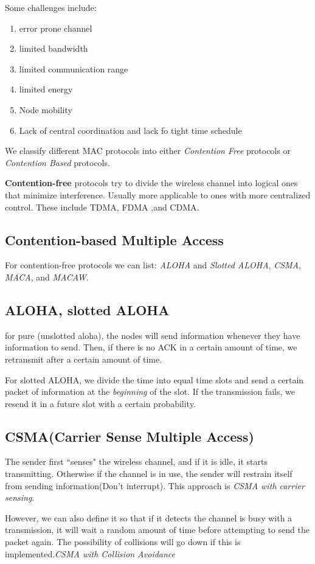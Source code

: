 \documentclass{article}
\begin{document}
Some challenges include:
\begin{enumerate}
		\item{error prone channel}
		\item{limited bandwidth}
		\item{limited communication range}
		\item{limited energy}
		\item{Node mobility}
		\item{Lack of central coordination and lack fo tight time schedule}
\end{enumerate}

We classify different MAC protocols into either \textit{Contention Free } protocols  or \textit{Contention Based}
protocols.

\textbf{Contention-free} protocols try to divide the wireless channel into logical ones that minimize interference.
Usually more applicable to ones with more centralized control. These include TDMA, FDMA ,and CDMA.
\subsection{Contention-based Multiple Access}
For contention-free protocols we can list: \textit{ALOHA} and \textit{Slotted ALOHA}, \textit{CSMA}, \textit{MACA},
and \textit{MACAW}.
\subsection{ALOHA, slotted ALOHA}
for pure (unslotted aloha), the nodes will send information whenever they have information to send. Then, if there
is no ACK in a certain amount of time, we retransmit after a certain amount of time.

For slotted ALOHA, we divide the time into equal time slots and send a certain packet of information at the 
\textit{beginning} of the slot. If the transmission fails, we resend it in a  future slot with a certain probability.
\subsection{CSMA(Carrier Sense Multiple Access)}
The sender first ``senses" the wireless channel, and if it is idle, it starts transmitting. Otherwise if the channel
is in use, the sender will restrain itself from sending information(Don't interrupt). This approach is 
\textit{CSMA with carrier sensing}.

However, we can also define it so that if it detects the channel is busy with a transmission, it will wait a random
amount of time before attempting to send the packet again. The possibility of collisions will go down if this is 
implemented.\textit{CSMA with Collision Avoidance}
\end{document}
